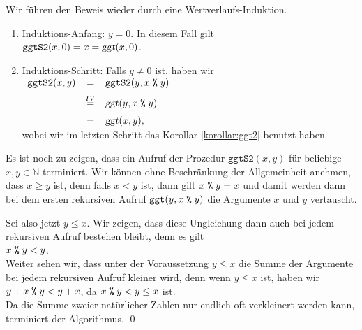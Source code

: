 \proof
Wir f\"{u}hren den Beweis wieder durch eine Wertverlaufs-Induktion.
\begin{enumerate}
\item Induktions-Anfang: $y = 0$.  In diesem Fall gilt
      \\[0.2cm]
      \hspace*{1.3cm}
      $\mathtt{ggtS2}(x, 0) = x = \textsl{ggt}(x, 0)$.
\item Induktions-Schritt: Falls $y \not= 0$ ist, haben wir
      \\[0.2cm]
      \hspace*{1.3cm}
      $
      \begin{array}[t]{lcl}
        \mathtt{ggtS2}(x, y) & = & \mathtt{ggtS2}(y, x \;\texttt{\%}\; y)              \\[0.2cm]
                             & \stackrel{IV}{=} & \textsl{ggt}(y, x \;\texttt{\%}\; y) \\[0.2cm]
                             & = & \textsl{ggt}(x, y),
      \end{array}
      $
      \\[0.2cm]
      wobei wir im letzten Schritt das Korollar \ref{korollar:ggt2} benutzt haben. 
\end{enumerate}
Es ist noch zu zeigen, dass ein Aufruf der Prozedur $\texttt{ggtS2}(x, y)$ f\"{u}r beliebige
$x,y \in \mathbb{N}$ terminiert.  Wir k\"{o}nnen ohne Beschr\"{a}nkung der Allgemeinheit anehmen,
dass $x \geq y$ ist, denn falls $x < y$ ist, dann gilt $x \;\texttt{\%}\; y = x$ und damit werden
dann bei dem ersten rekursiven Aufruf $\mathtt{ggt}(y, x \;\texttt{\%}\; y)$ die Argumente $x$ und
$y$ vertauscht.

Sei also jetzt $y \leq x$.  Wir zeigen, dass diese Ungleichung dann auch bei jedem
rekursiven Aufruf bestehen bleibt, denn es gilt
\\[0.2cm]
\hspace*{1.3cm}
$x \;\texttt{\%}\; y < y$.
\\[0.2cm]
Weiter sehen wir, dass unter der Voraussetzung $y \leq x$ die Summe der Argumente bei
jedem rekursiven Aufruf kleiner wird,
denn wenn $y \leq x$ ist, haben wir
\\[0.2cm]
\hspace*{1.3cm}
$y + x \;\texttt{\%}\; y < y + x$, \quad da $x \;\texttt{\%}\; y < y \leq x$ ist.
\\[0.2cm]
Da die Summe zweier nat\"{u}rlicher Zahlen nur endlich oft verkleinert werden kann, 
terminiert der Algorithmus.  
\qed


